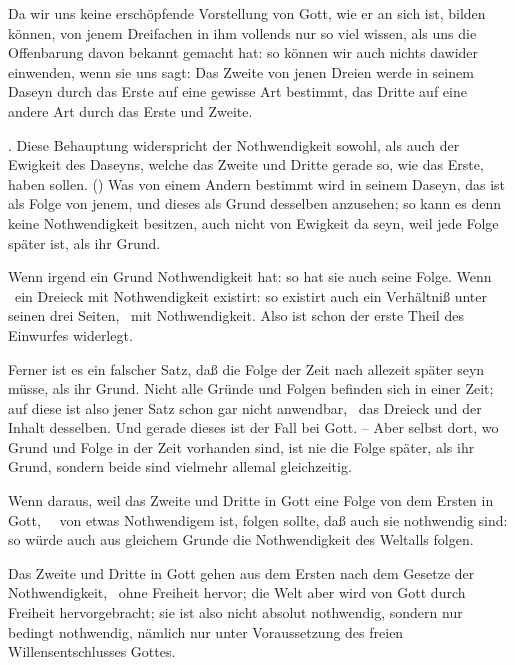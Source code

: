 Da wir uns keine erschöpfende Vorstellung von Gott, wie er an sich ist, bilden können, von jenem Dreifachen in ihm vollends nur so viel wissen, als uns die Offenbarung davon bekannt gemacht hat: so können wir auch nichts dawider einwenden, wenn sie uns sagt: Das Zweite von jenen Dreien werde in seinem Daseyn durch das Erste auf eine gewisse Art bestimmt, das Dritte auf eine andere Art durch das Erste und Zweite.\par
{}. Diese Behauptung widerspricht der Nothwendigkeit sowohl, als auch der Ewigkeit des Daseyns, welche das Zweite und Dritte gerade so, wie das Erste, haben sollen. () Was von einem Andern bestimmt wird in seinem Daseyn, das ist als Folge von jenem, und dieses als Grund desselben anzusehen; so kann es denn keine Nothwendigkeit besitzen, auch nicht von Ewigkeit da seyn, weil jede Folge später ist, als ihr Grund.\par
{}
\begin{aufza}
\item Wenn irgend ein Grund Nothwendigkeit hat: so hat sie auch seine Folge. Wenn \zB\ ein Dreieck mit Nothwendigkeit existirt: so existirt auch ein Verhältniß unter seinen drei Seiten, \usw\ mit Nothwendigkeit. Also ist schon der erste Theil des Einwurfes widerlegt.
\item Ferner ist es ein falscher Satz, daß die Folge der Zeit nach allezeit später seyn müsse, als ihr Grund. Nicht alle Gründe und Folgen befinden sich in einer Zeit; auf diese ist also jener Satz schon gar nicht anwendbar, \zB\ das Dreieck und der Inhalt desselben. Und gerade dieses ist der Fall bei Gott. -- Aber selbst dort, wo Grund und Folge in der Zeit vorhanden sind, ist nie die Folge später, als ihr Grund, sondern beide sind vielmehr allemal gleichzeitig.
\end{aufza}\par
{} Wenn daraus, weil das Zweite und Dritte in Gott eine Folge von dem Ersten in Gott, \dh~\ von etwas Nothwendigem ist, folgen sollte, daß auch sie nothwendig sind: so würde auch aus gleichem Grunde die Nothwendigkeit des Weltalls folgen.\par
{} Das Zweite und Dritte in Gott gehen aus dem Ersten nach dem Gesetze der Nothwendigkeit, \dh\ ohne Freiheit hervor; die Welt aber wird von Gott durch Freiheit hervorgebracht; sie ist also nicht absolut nothwendig, sondern nur bedingt nothwendig, nämlich nur unter Voraussetzung des freien Willensentschlusses Gottes.\par
